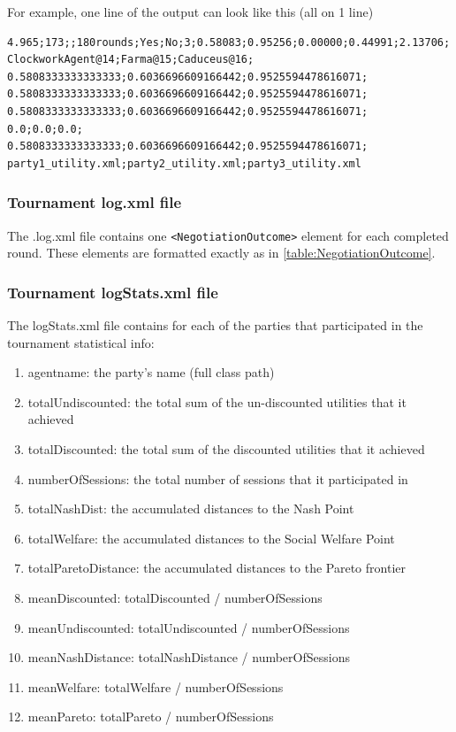 \documentclass[]{article}
\begin{document}
For example, one line of the output can look like this (all on 1 line)

\begin{verbatim}
4.965;173;;180rounds;Yes;No;3;0.58083;0.95256;0.00000;0.44991;2.13706;
ClockworkAgent@14;Farma@15;Caduceus@16;
0.5808333333333333;0.6036696609166442;0.9525594478616071;
0.5808333333333333;0.6036696609166442;0.9525594478616071;
0.5808333333333333;0.6036696609166442;0.9525594478616071;
0.0;0.0;0.0;
0.5808333333333333;0.6036696609166442;0.9525594478616071;
party1_utility.xml;party2_utility.xml;party3_utility.xml
\end{verbatim}

\subsubsection{Tournament log.xml file}

The .log.xml file contains one \verb|<NegotiationOutcome>| element for each completed round.
These elements are formatted exactly as in \ref{table:NegotiationOutcome}.

\subsubsection{Tournament logStats.xml file}
The logStats.xml file contains for each of the parties that participated in the tournament statistical info:

\begin{enumerate}
\item agentname: the party's name (full class path)
\item totalUndiscounted: the total sum of the un-discounted utilities that it achieved
\item totalDiscounted: the total sum of the discounted utilities that it achieved
\item numberOfSessions: the total number of sessions that it participated in
\item totalNashDist: the accumulated distances to the Nash Point
\item totalWelfare: the accumulated distances to the Social Welfare Point
\item totalParetoDistance: the accumulated distances to the Pareto frontier
\item meanDiscounted: totalDiscounted /  numberOfSessions
\item meanUndiscounted: totalUndiscounted /  numberOfSessions
\item meanNashDistance: totalNashDistance /  numberOfSessions
\item meanWelfare: totalWelfare /  numberOfSessions
\item meanPareto: totalPareto /  numberOfSessions
\end{enumerate}
\end{document}

